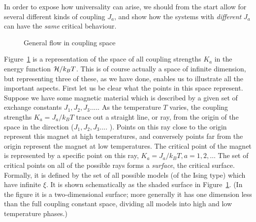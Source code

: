 \documentclass[
  letterpaper,
  enabledeprecatedfontcommands]{report}
\begin{document}
\begin{tcolorbox}
In order to expose how universality can arise, we should from the start
allow for several different kinds of coupling \(J_a\), and show how the
systems with \emph{different} \(J_a\) can have the \emph{same} critical
behaviour.

\begin{figure}[H]


\caption{\label{fig-flow2}General flow in coupling space}

\end{figure}%

Figure~\ref{fig-flow2} is a representation of the space of all coupling
strengths \(K_a\) in the energy function \({\cal H}/k_BT\). This is of
course actually a space of infinite dimension, but representing three of
these, as we have done, enables us to illustrate all the important
aspects. First let us be clear what the points in this space represent.
Suppose we have some magnetic material which is described by a given set
of exchange constants \(J_1,J_2,J_3.....\) As the temperature \(T\)
varies, the coupling strengths \(K_a=J_a/k_BT\) trace out a straight
line, or ray, from the origin of the space in the direction
(\(J_1,J_2,J_3 ....\) ). Points on this ray close to the origin
represent this magnet at high temperatures, and conversely points far
from the origin represent the magnet at low temperatures. The critical
point of the magnet is represented by a specific point on this ray,
\(K_a=
J_a/k_BT, a= 1,2,\dots\) The set of critical points on all of the
possible rays forms a \emph{surface}, the critical surface. Formally, it
is defined by the set of all possible models (of the Ising type) which
have infinite \(\xi\). It is shown schematically as the shaded surface
in Figure~\ref{fig-flow2}. (In the figure it is a two-dimensional
surface; more generally it has one dimension less than the full coupling
constant space, dividing all models into high and low temperature
phases.)


\end{tcolorbox}
\end{document}
